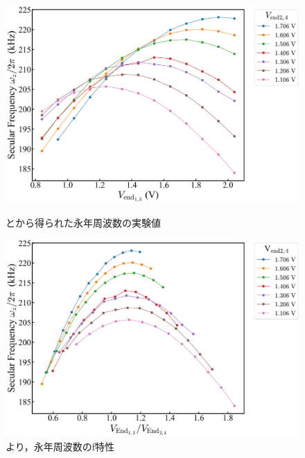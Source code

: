\begin{figure}[h]
	\begin{minipage}{0.5\linewidth}
		\begin{center}
			\includegraphics[width = 0.98\columnwidth]{./results/figure/Vendodd-SecFreqZ_Vendeven.jpg}
			\caption{とから得られた永年周波数の実験値}
			\label{fig:Vendodd_Vendeven}
		\end{center}
	\end{minipage}
	\begin{minipage}{0.5\linewidth}
		\begin{center}
			\includegraphics[width = 0.98\columnwidth]{./results/figure/Vendodd_Vendeven-SecFreqZ_.jpg}
			\caption{より，永年周波数のf特性}
			\label{fig:Vendodd_Vendeven_f}
		\end{center}
	\end{minipage}
\end{figure}

